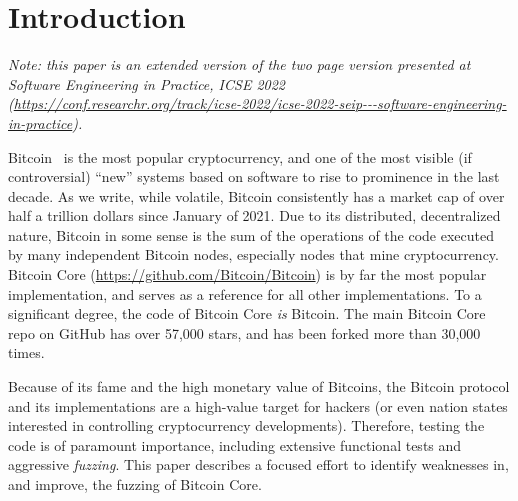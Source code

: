 \section{Introduction}

\begin{sloppypar}
  \emph{Note: this paper is an extended version of the two page version presented at Software Engineering in Practice, ICSE 2022 (\url{https://conf.researchr.org/track/icse-2022/icse-2022-seip---software-engineering-in-practice}).}
\end{sloppypar}

Bitcoin~\cite{nakamoto2008bitcoin} is the most popular cryptocurrency, and one of the most visible (if controversial) ``new'' systems based on software to rise to prominence in the last decade.  As we write, while volatile, Bitcoin consistently has a market cap of over half a trillion dollars since January of 2021.  Due to its distributed, decentralized nature, Bitcoin in some sense is the sum of the operations of the code executed by many independent Bitcoin nodes, especially nodes that mine cryptocurrency.  Bitcoin Core (\url{https://github.com/Bitcoin/Bitcoin}) is by far the most popular implementation, and serves as a reference for all other implementations.  To a significant degree, the code of Bitcoin Core \emph{is} Bitcoin.  The main Bitcoin Core repo on GitHub has over 57,000 stars, and has been forked more than 30,000 times.

Because of its fame and the high monetary value of Bitcoins, the Bitcoin protocol and its implementations are a high-value target for hackers (or even nation states interested in controlling cryptocurrency developments).  Therefore, testing the code is of paramount importance, including extensive functional tests and aggressive \emph{fuzzing}.  This paper describes a focused effort to identify weaknesses in, and improve, the fuzzing of Bitcoin Core.

